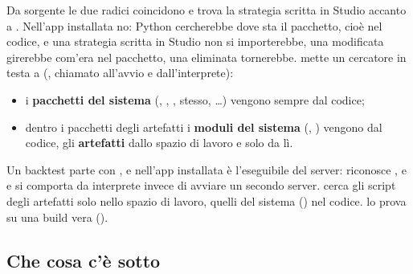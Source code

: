 Da sorgente le due radici coincidono e 
trova la strategia scritta in Studio accanto a .
Nell'app installata no: Python cercherebbe \pkgStrategie{} dove sta il
pacchetto, cioè nel codice, e una strategia scritta in Studio non si
importerebbe, una modificata girerebbe com'era nel pacchetto, una eliminata
tornerebbe.  mette un cercatore in testa a
 (, chiamato all'avvio e dall'interprete):

\begin{itemize}
  \item i \textbf{pacchetti del sistema} (\pkgCore, \pkgDati, \pkgReport,
        \pkgStrategie{} stesso, \ldots) vengono sempre dal codice;
  \item dentro i pacchetti degli artefatti i \textbf{moduli del sistema}
        (, ) vengono dal
        codice, gli \textbf{artefatti} dallo spazio di lavoro e solo da lì.
\end{itemize}

\noindent
Un backtest parte con , e
nell'app installata  è l'eseguibile del server:
 riconosce ,
 e  e si comporta da interprete invece di
avviare un secondo server.  cerca gli script degli
artefatti solo nello spazio di lavoro, quelli del sistema
() nel codice. 
lo prova su una build vera ().

\subsection{Che cosa c'è sotto }

